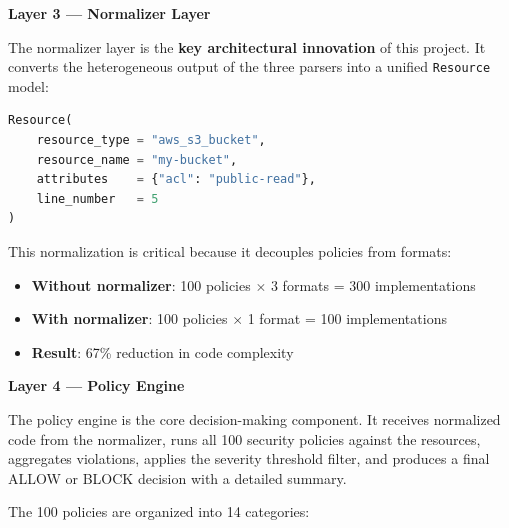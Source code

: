 \vspace{0.5cm}
\noindent\textbf{Layer 3 — Normalizer Layer}

The normalizer layer is the \textbf{key architectural innovation} of this project. It converts the heterogeneous output of the three parsers into a unified \texttt{Resource} model:

\begin{lstlisting}[language=Python, caption={Unified Resource model}, label={lst:resource}]
Resource(
    resource_type = "aws_s3_bucket",
    resource_name = "my-bucket",
    attributes    = {"acl": "public-read"},
    line_number   = 5
)
\end{lstlisting}

This normalization is critical because it decouples policies from formats:
\begin{itemize}
    \item \textbf{Without normalizer}: 100 policies $\times$ 3 formats = 300 implementations
    \item \textbf{With normalizer}: 100 policies $\times$ 1 format = 100 implementations
    \item \textbf{Result}: 67\% reduction in code complexity
\end{itemize}

\vspace{0.5cm}
\noindent\textbf{Layer 4 — Policy Engine}

The policy engine is the core decision-making component. It receives normalized code from the normalizer, runs all 100 security policies against the resources, aggregates violations, applies the severity threshold filter, and produces a final ALLOW or BLOCK decision with a detailed summary.

The 100 policies are organized into 14 categories:

